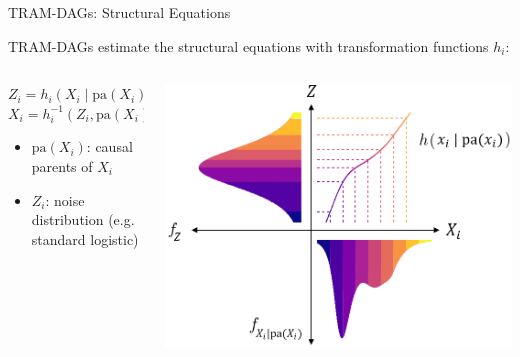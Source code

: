 \documentclass[onlytextwidth,english]{beamer}\usepackage[]{graphicx}\usepackage[]{xcolor}
\begin{document}
\begin{frame}{TRAM-DAGs: Structural Equations}


TRAM-DAGs estimate the structural equations with transformation functions $h_i$:

\begin{columns}

\begin{column}{0.5\textwidth}

$Z_i = h_i(X_i \mid \text{pa}(X_i))$ \\
$X_i = h_i^{-1}(Z_i, \text{pa}(X_i)) = f_i(Z_i, \text{pa}(X_i))$ \\

\vspace{1.5em}

\begin{itemize}
    \item $\text{pa}(X_i)$: causal parents of $X_i$
    \item $Z_i$: noise distribution (e.g. standard logistic)
\end{itemize}

\end{column}

\begin{column}{0.5\textwidth}
\includegraphics[width=\textwidth]{img/trafo_xi.png}
\end{column}
\end{columns}


\end{frame}
\end{document}
